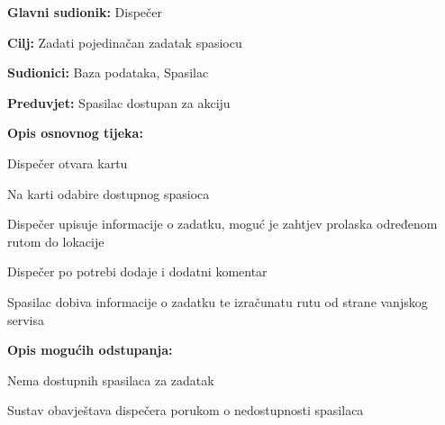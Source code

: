 					\noindent {}
					\begin{packed_item}
	
						\item \textbf{Glavni sudionik: }\text Dispečer
						\item  \textbf{Cilj:} \text Zadati pojedinačan zadatak spasiocu
						\item  \textbf{Sudionici:} \text Baza podataka, Spasilac
						\item  \textbf{Preduvjet:} \text Spasilac dostupan za akciju
						\item  \textbf{Opis osnovnog tijeka:}
						
						\item[] \begin{packed_enum}
	
							\item \text Dispečer otvara kartu
							\item \text Na karti odabire dostupnog spasioca
							\item \text Dispečer upisuje informacije o zadatku, moguć je zahtjev prolaska određenom rutom do lokacije
							\item \text Dispečer po potrebi dodaje i dodatni komentar
							\item \text Spasilac dobiva informacije o zadatku te izračunatu rutu od strane vanjskog servisa
						\end{packed_enum}
						
						\item  \textbf{Opis mogućih odstupanja:}
						
						\item[] \begin{packed_item}
	
							\item[2.a] \text Nema dostupnih spasilaca za zadatak
							\item[] \begin{packed_item}
								
								\item \text Sustav obavještava dispečera porukom o nedostupnosti spasilaca
								
							\end{packed_item}
							
						\end{packed_item}
					\end{packed_item}		

